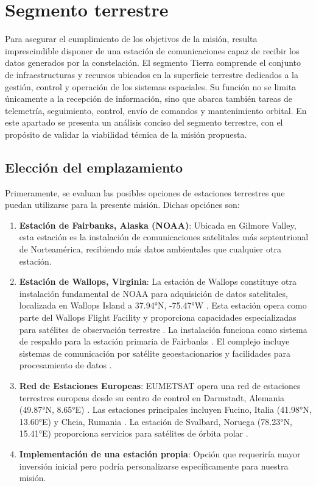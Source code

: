 \chapter{Segmento terrestre} \label{tierra}
\minitoc

Para asegurar el cumplimiento de los objetivos de la misión, resulta imprescindible disponer de una estación de comunicaciones capaz de recibir los datos generados por la constelación. El segmento Tierra comprende el conjunto de infraestructuras y recursos ubicados en la superficie terrestre dedicados a la gestión, control y operación de los sistemas espaciales. Su función no se limita únicamente a la recepción de información, sino que abarca también tareas de telemetría, seguimiento, control, envío de comandos y mantenimiento orbital. En este apartado se presenta un análisis conciso del segmento terrestre, con el propósito de validar la viabilidad técnica de la misión propuesta.
\newpage
\section{Elección del emplazamiento}

Primeramente, se evaluan las posibles opciones de estaciones terrestres que puedan utilizarse para la presente misión. Dichas opciónes son:


\begin{enumerate}
    \item \textbf{Estación de Fairbanks, Alaska (NOAA)}: Ubicada en Gilmore Valley, esta estación es la instalación de comunicaciones satelitales más septentrional de Norteamérica, recibiendo más datos ambientales que cualquier otra estación.
    \item \textbf{Estación de Wallops, Virginia}: La estación de Wallops constituye otra instalación fundamental de NOAA para adquisición de datos satelitales, localizada en Wallops Island a 37.94°N, -75.47°W . Esta estación opera como parte del Wallops Flight Facility y proporciona capacidades especializadas para satélites de observación terrestre . La instalación funciona como sistema de respaldo para la estación primaria de Fairbanks . El complejo incluye sistemas de comunicación por satélite geoestacionarios y facilidades para procesamiento de datos \cite{noaa_wallops_2019}.
    \item \textbf{Red de Estaciones Europeas}: EUMETSAT opera una red de estaciones terrestres europeas desde su centro de control en Darmstadt, Alemania (49.87°N, 8.65°E) . Las estaciones principales incluyen Fucino, Italia (41.98°N, 13.60°E) y Cheia, Rumania . La estación de Svalbard, Noruega (78.23°N, 15.41°E) proporciona servicios para satélites de órbita polar  \cite{eumetsat_ground_segment_2025}.
    \item \textbf{Implementación de una estación propia}: Opción que requeriría mayor inversión inicial pero podría personalizarse específicamente para nuestra misión.
\end{enumerate}

